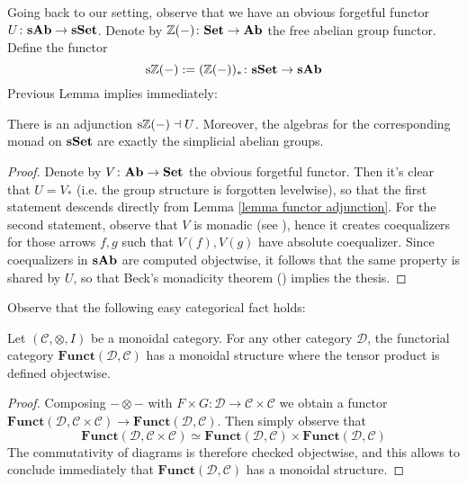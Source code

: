 \begin{refsection}
Going back to our setting, observe that we have an obvious forgetful functor $U \colon \mathbf s \mathbf{Ab} \to \mathbf{sSet}$. Denote by $\mathbb{Z}(-) \colon \mathbf{Set} \to \mathbf{Ab}$ the free abelian group functor. Define the functor
\[
\mathrm s \mathbb{Z}(-) := (\mathbb{Z}(-))_* \colon \mathbf{sSet} \to \mathbf s \mathbf{Ab}
\]
Previous Lemma implies immediately:

\begin{cor} \label{cor beck's monadicity}
There is an adjunction $\mathrm s \mathbb{Z}(-) \dashv U$. Moreover, the algebras for the corresponding monad on $\mathbf{sSet}$ are exactly the simplicial abelian groups.
\end{cor}

\begin{proof}
Denote by $V \colon \mathbf{Ab} \to \mathbf{Set}$ the obvious forgetful functor. Then it's clear that $U = V_*$ (i.e. the group structure is forgotten levelwise), so that the first statement descends directly from Lemma \ref{lemma functor adjunction}. For the second statement, observe that $V$ is monadic (see \cite[Thm. VI.8.1]{cwm}), hence it creates coequalizers for those arrows $f,g$ such that $V(f), V(g)$ have absolute coequalizer. Since coequalizers in $\mathbf s \mathbf{Ab}$ are computed objectwise, it follows that the same property is shared by $U$, so that Beck's monadicity theorem (\cite[Thm. VI.7.1]{cwm}) implies the thesis.
\end{proof}

Observe that the following easy categorical fact holds:

\begin{lemma}
Let $(\mathcal C, \otimes, I)$ be a monoidal category. For any other category $\mathcal D$, the functorial category $\mathbf{Funct}(\mathcal D, \mathcal C)$ has a monoidal structure where the tensor product is defined objectwise.
\end{lemma}

\begin{proof}
Composing $- \otimes -$ with $F \times G \colon \mathcal D \to \mathcal C \times \mathcal C$ we obtain a functor $\mathbf{Funct}(\mathcal D, \mathcal C \times \mathcal C) \to \mathbf{Funct}(\mathcal D, \mathcal C)$. Then simply observe that
\[
\mathbf{Funct}(\mathcal D, \mathcal C \times \mathcal C) \simeq \mathbf{Funct}(\mathcal D, \mathcal C) \times \mathbf{Funct}(\mathcal D, \mathcal C)
\]
The commutativity of diagrams is therefore checked objectwise, and this allows to conclude immediately that $\mathbf{Funct}(\mathcal D, \mathcal C)$ has a monoidal structure.
\end{proof}


\end{refsection}
